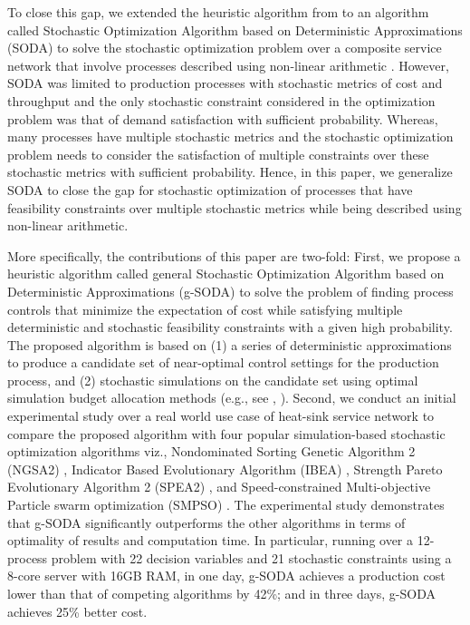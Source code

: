 \documentclass[a4paper, 12pt]{article} %
\begin{document}
To close this gap, we extended the heuristic algorithm from \cite{Krishnamoorthy2015} to an algorithm called Stochastic Optimization Algorithm based on Deterministic Approximations (SODA) to solve the stochastic optimization problem over a composite service network that involve processes described using non-linear arithmetic \cite{GMU-CS-TR-2017-3}.
However, SODA was limited to production processes with stochastic metrics of cost and throughput and the only stochastic constraint considered in the optimization problem was that of demand satisfaction with sufficient probability. Whereas, many processes have multiple stochastic metrics and the stochastic optimization problem needs to consider the satisfaction of multiple constraints over these stochastic metrics with sufficient probability. 
Hence, in this paper, we generalize SODA to close the gap for stochastic optimization of processes that have feasibility constraints over multiple stochastic metrics while being described using non-linear arithmetic.

More specifically, the contributions of this paper are two-fold:
First, we propose a heuristic algorithm called general Stochastic Optimization Algorithm based on Deterministic Approximations (g-SODA) to solve the problem of finding process controls that minimize the expectation of cost while satisfying multiple deterministic and stochastic feasibility constraints with a given high probability. 
The proposed algorithm is based on (1) a series of deterministic approximations to produce a candidate set of near-optimal control settings for the production process, and (2) stochastic simulations on the candidate set using optimal simulation budget allocation methods (e.g., see \cite{Chen2011}, \cite{Lee2012OCBACO}).  
Second, we conduct an initial experimental study over a real world use case of heat-sink service network to compare the proposed algorithm with four popular simulation-based stochastic optimization algorithms viz., Nondominated Sorting Genetic Algorithm 2 (NGSA2) \cite{ngsa2}, Indicator Based Evolutionary Algorithm (IBEA) \cite{ibea}, Strength Pareto Evolutionary Algorithm 2 (SPEA2) \cite{spea2}, and Speed-constrained Multi-objective Particle swarm optimization (SMPSO) \cite{NDG09}.
 The experimental study demonstrates that g-SODA significantly outperforms the other algorithms in terms of optimality of results and computation time. In particular, 
running over a 12-process problem with 22 decision variables and 21 stochastic constraints using a 8-core server with 16GB RAM,
in one day, g-SODA achieves a production cost lower than that of competing algorithms by 42\%; and in three days, g-SODA achieves 25\% better cost.
\end{document}
